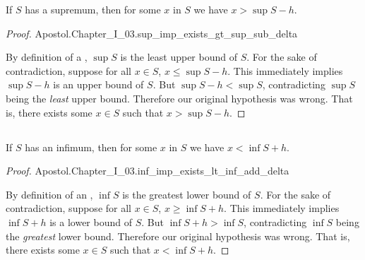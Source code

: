 \documentclass{report}
\begin{document}
\begin{theorem}[I.32a]

  If $S$ has a supremum, then for some $x$ in $S$ we have $x > \sup{S} - h$.

\end{theorem}

\begin{proof}

    {Apostol.Chapter\_I\_03.sup\_imp\_exists\_gt\_sup\_sub\_delta}

  By definition of a , $\sup{S}$ is the least upper
    bound of $S$.
  For the sake of contradiction, suppose for all $x \in S$,
    $x \leq \sup{S} - h$.
  This immediately implies $\sup{S} - h$ is an upper bound of $S$.
  But $\sup{S} - h < \sup{S}$, contradicting $\sup{S}$ being the \textit{least}
    upper bound.
  Therefore our original hypothesis was wrong.
  That is, there exists some $x \in S$ such that $x > \sup{S} - h$.

\end{proof}

\subsection{}%
\label{sub:theorem-i.32b}

\begin{theorem}[I.32b]

  If $S$ has an infimum, then for some $x$ in $S$ we have $x < \inf{S} + h$.

\end{theorem}

\begin{proof}

    {Apostol.Chapter\_I\_03.inf\_imp\_exists\_lt\_inf\_add\_delta}

  By definition of an , $\inf{S}$ is the greatest lower
    bound of $S$.
  For the sake of contradiction, suppose for all $x \in S$,
    $x \geq \inf{S} + h$.
  This immediately implies $\inf{S} + h$ is a lower bound of $S$.
  But $\inf{S} + h > \inf{S}$, contradicting $\inf{S}$ being the
    \textit{greatest} lower bound.
  Therefore our original hypothesis was wrong.
  That is, there exists some $x \in S$ such that $x < \inf{S} + h$.

\end{proof}

\section{}%
\label{sec:additive-property-supremums-infimums}
\label{sec:theorem-i.33}
\end{document}
